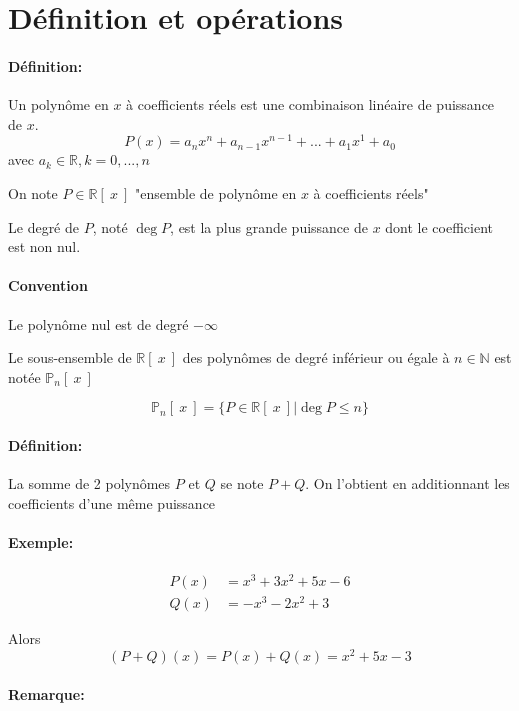 \documentclass[
    11pt,
    a4paper,
    oneside,
    headinlcude, footinclude,
    twoside,
]{report}
\begin{document}
\section{Définition et opérations}

\paragraph{Définition:}

Un polynôme en $x$ à coefficients réels est une combinaison linéaire de
puissance de $x$.
$$P(x) = a_{n}x^{n}+a_{n-1}x^{n-1}+...+a_{1}x^{1} + a_{0}$$
avec $a_{k} \in \mathbb{R}, k= 0, ..., n$

On note $P \in \mathbb{R}[\ x\ ]$ {\color{red} "ensemble de polynôme en $x$ à
coefficients réels"}

Le degré de $P$, noté $\deg P$, est la plus grande puissance de $x$ dont le
coefficient est non nul.

\paragraph{Convention}
\label{par:convention}

Le polynôme nul est de degré $-\infty$ 

Le sous-ensemble de $\mathbb{R}[\ x\ ]$ des polynômes de degré inférieur ou
égale à $n \in \mathbb{N}$ est notée $\mathbb{P}_{n} [\ x\ ]$

$$\mathbb{P}_{n}[\ x\ ] = \{ P \in \mathbb{R}[\ x\ ] | \deg P \leq n\}$$

\paragraph{Définition:}

La somme de 2 polynômes $P$ et $Q$ se note $P + Q$. On l'obtient en
additionnant  les coefficients d'une même puissance 

\paragraph{Exemple:}

\[
    \begin{split}
        P(x) & = x^{3} + 3 x^{2} + 5x - 6\\
        Q(x) &= -x^{3} - 2x^{2} + 3
    \end{split}
\]

Alors 
$$(P+Q) (x) = P(x) + Q(x) = x^{2} + 5x -3$$

\paragraph{Remarque:}
\end{document}
